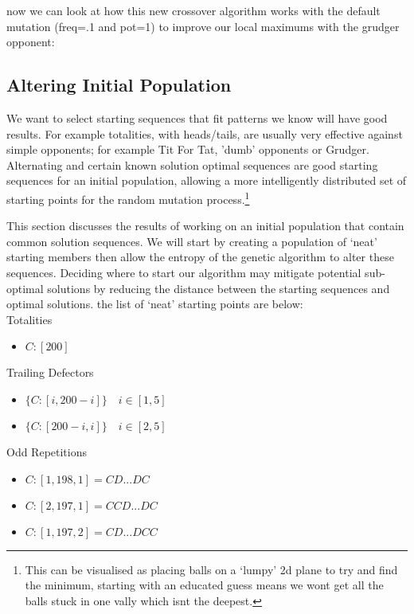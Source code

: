 now we can look at how this new crossover algorithm works with the default mutation (freq=.1 and pot=1) to improve our local maximums with the grudger opponent:\\

            
\subsection{Altering Initial Population}
We want to select starting sequences that fit patterns we know will have good results. For example totalities, with heads/tails, are usually very effective against simple opponents; for example Tit For Tat, 'dumb' opponents or Grudger. Alternating and certain known solution optimal sequences are good starting sequences for an initial population, allowing a more intelligently distributed set of starting points for the random mutation process.\footnote{This can be visualised as placing balls on a `lumpy' 2d plane to try and find the minimum, starting with an educated guess means we wont get all the balls stuck in one vally which isnt the deepest.}
    
This section discusses the results of working on an initial population that contain common solution sequences. 
We will start by creating a population of `neat' starting members then allow the entropy of the genetic algorithm to alter these sequences.
Deciding where to start our algorithm may mitigate potential sub-optimal solutions by reducing the distance between the starting sequences and optimal solutions. the list of `neat' starting points are below:\\

Totalities
\begin{itemize}
    \item $C:[200]$
\end{itemize}
     
Trailing Defectors
\begin{itemize}
    \item $\{C:[i,200-i]\} \quad i\in [1,5]$
    \item $\{C:[200-i,i]\} \quad i\in [2,5]$
\end{itemize}
     
Odd Repetitions
\begin{itemize}
    \item $C:[1,198,1] = CD...DC$
    \item $C:[2,197,1] = CCD...DC$
    \item $C:[1,197,2] = CD...DCC$
\end{itemize}
    
